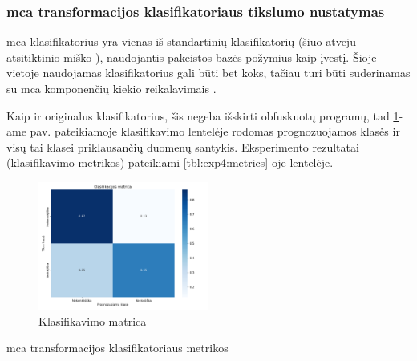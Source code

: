 \subsubsection{\gls{mca} transformacijos klasifikatoriaus tikslumo nustatymas}

\gls{mca} klasifikatorius yra vienas iš standartinių klasifikatorių (šiuo atveju atsitiktinio miško ), naudojantis pakeistos bazės požymius kaip įvestį. Šioje vietoje naudojamas klasifikatorius gali būti bet koks, tačiau turi būti suderinamas su \gls{mca} komponenčių kiekio reikalavimais . 

Kaip ir originalus klasifikatorius, šis negeba išskirti obfuskuotų programų, tad \ref{fig:exp4:confusion}-ame pav. pateikiamoje klasifikavimo lentelėje rodomas prognozuojamos klasės ir visų tai klasei priklausančių duomenų santykis.
Eksperimento rezultatai (klasifikavimo metrikos) pateikiami \ref{tbl:exp4:metrics}-oje lentelėje.
\begin{figure}[h]
    \centering
    \includegraphics[width=0.5\textwidth]{images/mca_2x2.png}
    \caption{Klasifikavimo matrica}
    \label{fig:exp4:confusion}
\end{figure}

\begin{table}[h]
    \caption{\gls{mca} transformacijos klasifikatoriaus metrikos}
    \centering
    \label{tbl:exp4:metrics}
\end{table}